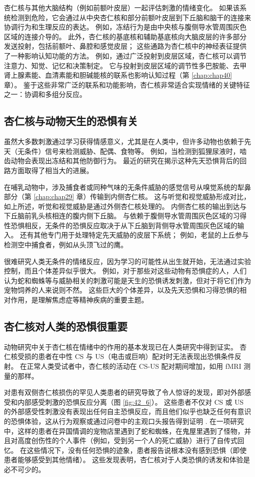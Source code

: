 杏仁核与其他大脑结构（例如前额叶皮层）一起评估刺激的情绪变化。 如果该系统检测到危险，它会通过从中央杏仁核和部分前额叶皮层到下丘脑和脑干的连接来协调行为和生理反应的表达。 例如，冻结行为是由中央核与腹侧导水管周围灰色区域的连接介导的。 此外，杏仁核的基底核和辅助基底核向大脑皮层的许多部分发送投射，包括前额叶、鼻腔和感觉皮层； 这些通路为杏仁核中的神经表征提供了一种影响认知功能的方法。 例如，通过广泛投射到皮层区域，杏仁核可以调节注意力、知觉、记忆和决策制定。 它与投射到皮层区域的调节性多巴胺能、去甲肾上腺素能、血清素能和胆碱能核的联系也影响认知过程（第 \ref{chap:chap40} 章）。 鉴于这些非常广泛的联系和功能影响，杏仁核非常适合实现情绪的关键特征之一：协调和多组分反应。

\subsection{杏仁核与动物天生的恐惧有关}
虽然大多数刺激通过学习获得情感意义，尤其是在人类中，但许多动物也依赖于先天（无条件）信号来检测威胁、配偶、食物等。 例如，当检测到狐狸尿液时，啮齿动物会表现出冻结和其他防御行为。 最近的研究在揭示这种先天恐惧背后的回路方面取得了相当大的进展。

在哺乳动物中，涉及捕食者或同种气味的无条件威胁的感觉信号从嗅觉系统的犁鼻部分（第 \ref{chap:chap29} 章）传输到内侧杏仁核。 这与听觉和视觉威胁形成对比，如上所述，听觉和视觉威胁是通过外侧杏仁核处理的。 内侧杏仁核的输出到达与下丘脑前乳头核相连的腹内侧下丘脑。 与依赖于腹侧导水管周围灰色区域的习得性恐惧相反，无条件的恐惧反应取决于从下丘脑到背侧导水管周围灰色区域的输入。 还有其他专门用于处理特定先天威胁的皮层下系统； 例如，老鼠的上丘参与检测空中捕食者，例如从头顶飞过的鹰。

很难研究人类无条件的情绪反应，因为学习的可能性从出生就开始，无法通过实验控制，而且个体差异似乎很大。 例如，对于那些对这些动物有恐惧症的人，人们认为蛇和蜘蛛等与威胁相关的刺激可能是天生的恐惧诱发刺激，但对于将它们作为宠物饲养的人来说则不然。 这些巨大的个体差异，以及先天恐惧和习得恐惧的相对作用，是理解焦虑症等精神疾病的重要主题。

\subsection{杏仁核对人类的恐惧很重要}
动物研究中关于杏仁核在情绪中的作用的基本发现已在人类研究中得到证实。 杏仁核受损的患者在中性 CS 与 US（电击或巨响）配对时无法表现出恐惧条件反射。 在正常人类受试者中，杏仁核的活动在 CS-US 配对期间增加，如用 fMRI 测量的那样。

对患有双侧杏仁核损伤的罕见人类患者的研究导致了令人惊讶的发现，即对外部感受和内部感受刺激的恐惧反应分离（图 \ref{fig:42_6}）。 
这些患者不仅对 CS 或 US 的外部感受性刺激没有表现出任何自主恐惧反应，而且他们似乎也缺乏任何有意识的恐惧体验，这从行为观察或通过问卷中的主观口头报告得到证明 . 在一项研究中，这样的患者在异国情调的宠物店里遇到了蛇和蜘蛛，在鬼屋里遇到了怪物，并且对高度创伤性的个人事件（例如，受到另一个人的死亡威胁）进行了自传式回忆。 在这些情况下，没有任何恐惧的迹象，患者报告说根本没有感到恐惧（即使患者能够感受到其他情绪）。 这些发现表明，杏仁核对于人类恐惧的诱发和体验是必不可少的。

